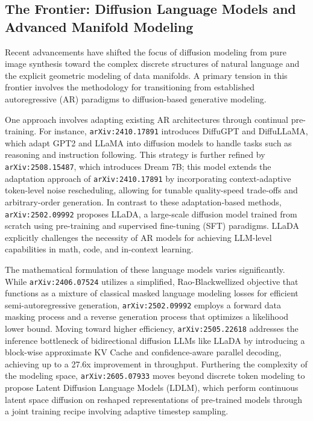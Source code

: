 \documentclass[11pt]{article}
\begin{document}
\subsection{The Frontier: Diffusion Language Models and Advanced Manifold Modeling}

Recent advancements have shifted the focus of diffusion modeling from pure image synthesis toward the complex discrete structures of natural language and the explicit geometric modeling of data manifolds. A primary tension in this frontier involves the methodology for transitioning from established autoregressive (AR) paradigms to diffusion-based generative modeling.

One approach involves adapting existing AR architectures through continual pre-training. For instance, \texttt{arXiv:2410.17891} introduces DiffuGPT and DiffuLLaMA, which adapt GPT2 and LLaMA into diffusion models to handle tasks such as reasoning and instruction following. This strategy is further refined by \texttt{arXiv:2508.15487}, which introduces Dream 7B; this model extends the adaptation approach of \texttt{arXiv:2410.17891} by incorporating context-adaptive token-level noise rescheduling, allowing for tunable quality-speed trade-offs and arbitrary-order generation. In contrast to these adaptation-based methods, \texttt{arXiv:2502.09992} proposes LLaDA, a large-scale diffusion model trained from scratch using pre-training and supervised fine-tuning (SFT) paradigms. LLaDA explicitly challenges the necessity of AR models for achieving LLM-level capabilities in math, code, and in-context learning.

The mathematical formulation of these language models varies significantly. While \texttt{arXiv:2406.07524} utilizes a simplified, Rao-Blackwellized objective that functions as a mixture of classical masked language modeling losses for efficient semi-autoregressive generation, \texttt{arXiv:2502.09992} employs a forward data masking process and a reverse generation process that optimizes a likelihood lower bound. Moving toward higher efficiency, \texttt{arXiv:2505.22618} addresses the inference bottleneck of bidirectional diffusion LLMs like LLaDA by introducing a block-wise approximate KV Cache and confidence-aware parallel decoding, achieving up to a 27.6x improvement in throughput. Furthering the complexity of the modeling space, \texttt{arXiv:2605.07933} moves beyond discrete token modeling to propose Latent Diffusion Language Models (LDLM), which perform continuous latent space diffusion on reshaped representations of pre-trained models through a joint training recipe involving adaptive timestep sampling.
\end{document}
